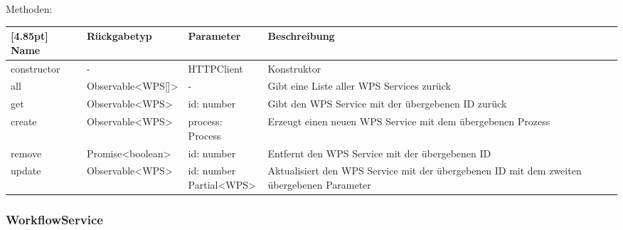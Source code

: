                 Methoden:
        		\begin{center}
                \setlength\tabcolsep{5pt}
                	\renewcommand{\arraystretch}{1.5}
                    	\begin{tabularx}{\textwidth}{|l|l|l|X|}
                    	\hline
                    	\rowcolor[gray]{0.75}[4.85pt]
                		Name & Rückgabetyp & Parameter & Beschreibung \\ \hline 
                        constructor & - & HTTPClient & Konstruktor\\ \hline
                        all & Observable<WPS[]> & - & Gibt eine Liste aller WPS Services zurück\\ \hline
                        get & Observable<WPS> & id: number & Gibt den WPS Service mit der übergebenen ID zurück \\ \hline
                        create & Observable<WPS> & process: Process & Erzeugt einen neuen WPS Service mit dem übergebenen Prozess \\ \hline
                        remove & Promise<boolean> & id: number & Entfernt den WPS Service mit der übergebenen ID \\ \hline
                        update & Observable<WPS> & \thead{id: number\\Partial<WPS>} & Aktualisiert den WPS Service mit der übergebenen ID mit dem zweiten übergebenen Parameter \\ \hline
                        \end{tabularx}
        		\end{center}
            
            \subsubsection{WorkflowService}
                
